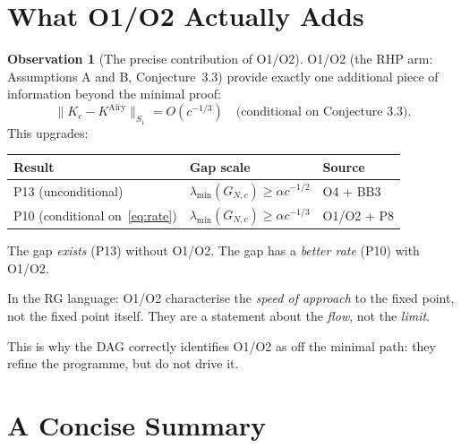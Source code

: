\documentclass[12pt,a4paper]{amsart}
\theoremstyle{definition}
\newtheorem{observation}[theorem]{Observation}
\newcommand{\KAi}{K^{\mathrm{Airy}}}
\newcommand{\norm}[1]{\|#1\|}
\begin{document}
\section{What O1/O2 Actually Adds}
\label{sec:o1o2}

\begin{observation}[The precise contribution of O1/O2]\label{obs:o1o2}
O1/O2 (the RHP arm: Assumptions A and B, Conjecture~3.3)
provide exactly one additional piece of information beyond the
minimal proof:
\begin{equation}\label{eq:rate}
  \norm{K_c - \KAi}_{S_1} = O(c^{-1/3})
  \quad\text{(conditional on Conjecture~3.3)}.
\end{equation}
This upgrades:
\begin{center}
\begin{tabular}{lll}
\toprule
Result & Gap scale & Source\\
\midrule
P13 (unconditional) & $\lambda_{\min}(G_{N,c}) \ge \alpha c^{-1/2}$ & O4 + BB3\\
P10 (conditional on~\eqref{eq:rate}) & $\lambda_{\min}(G_{N,c}) \ge \alpha c^{-1/3}$ & O1/O2 + P8\\
\bottomrule
\end{tabular}
\end{center}
The gap \emph{exists} (P13) without O1/O2.
The gap has a \emph{better rate} (P10) with O1/O2.

In the RG language:
O1/O2 characterise the \emph{speed of approach} to the fixed point,
not the fixed point itself.
They are a statement about the \emph{flow}, not the \emph{limit}.

This is why the DAG correctly identifies O1/O2 as off the minimal path:
they refine the programme, but do not drive it.
\end{observation}

\section{A Concise Summary}
\label{sec:summary}
\end{document}
